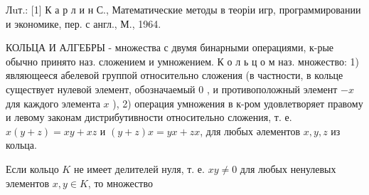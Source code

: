 \documentclass[10pt]{article}
\begin{document}
Лuт.: [1] К а р л и н С., Математические методы в теоріи игр, программировании и экономике, пер. с англ., М., 1964.



КОЛЬЦА И АЛГЕБРЫ - множества с двумя бинарными операциями, к-рые обычно принято наз. сложением и умножением. К о л ь ц о м наз. множество: 1) являющееся абелевой группой относительно сложения (в частности, в кольце существует нулевой элемент, обозначаемый 0 , и противоположный элемент $-x$ для каждого элемента $x$ ), 2) операция умножения в к-ром удовлетворяет правому и левому законам дистрибутивности относительно сложения, т. е. $x(y+z)=x y+x z$ и $(y+z) x=y x+z x$, для любых әлементов $x, y, z$ из кольца.



Если кольцо $K$ не имеет делителей нуля, т. е. $x y \neq 0$ для любых ненулевых элементов $x, y \in K$, то множество
\end{document}
